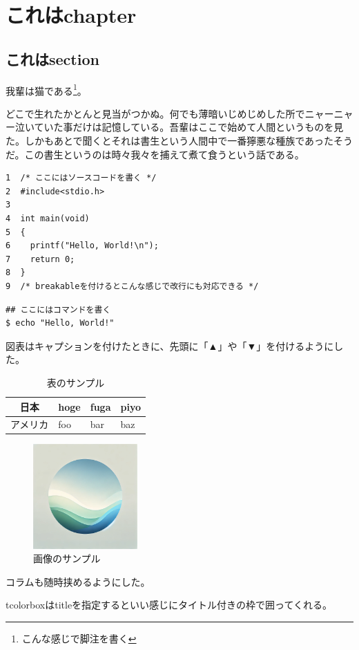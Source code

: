 \documentclass[b5paper]{ltjsbook}
\begin{document}
\chapter{これはchapter}
\section{これはsection}
我輩は猫である\footnote{こんな感じで脚注を書く}。

どこで生れたかとんと見当がつかぬ。何でも薄暗いじめじめした所でニャーニャー泣いていた事だけは記憶している。吾輩はここで始めて人間というものを見た。しかもあとで聞くとそれは書生という人間中で一番獰悪な種族であったそうだ。この書生というのは時々我々を捕えて煮て食うという話である。

\begin{tcolorbox}[breakable]
\begin{verbatim}
1  /* ここにはソースコードを書く */
2  #include<stdio.h>
3
4  int main(void)
5  {
6    printf("Hello, World!\n");
7    return 0;
8  }
9  /* breakableを付けるとこんな感じで改行にも対応できる */
\end{verbatim}
\end{tcolorbox}

\begin{alltt}
\begin{verbatim}
## ここにはコマンドを書く
$ echo "Hello, World!"
\end{verbatim}
\end{alltt}

図表はキャプションを付けたときに、先頭に「▲」や「▼」を付けるようにした。

\begin{table}[ht]
  \centering
  \caption{表のサンプル}
  \begin{tabular}{|c|l|l|l|} \hline
    日本 & hoge & fuga & piyo \\ \hline
    アメリカ & foo & bar & baz \\ \hline
  \end{tabular}
  \label{table-sample}
\end{table}

\begin{figure}[ht]
  \centering
  \includegraphics[width=4cm]{../res/image.jpg}
  \caption{画像のサンプル}
  \label{figure-sample}
\end{figure}

\begin{tcolorbox}[title=これはコラム]
  コラムも随時挟めるようにした。

  tcolorboxはtitleを指定するといい感じにタイトル付きの枠で囲ってくれる。
\end{tcolorbox}
\end{document}
